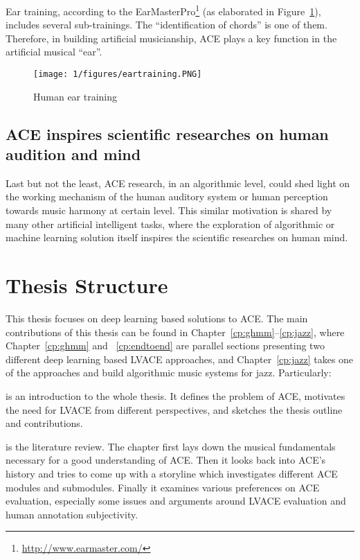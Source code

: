 Ear training, according to the EarMasterPro\footnote{\url{http://www.earmaster.com/}} (as elaborated in Figure~\ref{fig:1-eartraining}), includes several sub-trainings. The ``identification of chords'' is one of them. Therefore, in building artificial musicianship, ACE plays a key function in the artificial musical ``ear''.
\begin{figure}
\centering
\texttt{[image: 1/figures/eartraining.PNG]}
\caption{Human ear training}
\label{fig:1-eartraining}
\end{figure}

\subsection{ACE inspires scientific researches on human audition and mind}
Last but not the least, ACE research, in an algorithmic level, could shed light on the working mechanism of the human auditory system or human perception towards music harmony at certain level. This similar motivation is shared by many other artificial intelligent tasks\cite{lecun1995convolutional,hinton1995wake}, where the exploration of algorithmic or machine learning solution itself inspires the scientific researches on human mind.

\section{Thesis Structure} \label{sec:1-outline}
This thesis focuses on deep learning based solutions to ACE. The main contributions of this thesis can be found in Chapter~\ref{cp:ghmm}--\ref{cp:jazz}, where Chapter~\ref{cp:ghmm} and ~\ref{cp:endtoend} are parallel sections presenting two different deep learning based LVACE approaches, and Chapter~\ref{cp:jazz} takes one of the approaches and build algorithmic music systems for jazz. Particularly:

 is an introduction to the whole thesis. It defines the problem of ACE, motivates the need for LVACE from different perspectives, and sketches the thesis outline and contributions.

 is the literature review. The chapter first lays down the musical fundamentals necessary for a good understanding of ACE. Then it looks back into ACE's history and tries to come up with a storyline which investigates different ACE modules and submodules. Finally it examines various preferences on ACE evaluation, especially some issues and arguments around LVACE evaluation and human annotation subjectivity.

